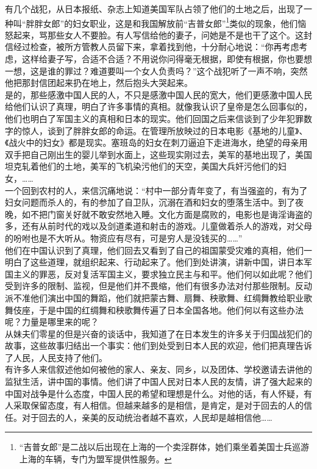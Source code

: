 有几个战犯，从日本报纸、杂志上知道美国军队占领了他们的土地之后，出现了一种叫“胖胖女郎”的妇女职业，这是和我国解放前“吉普女郎”\footnote{“吉普女郎”是二战以后出现在上海的一个卖淫群体，她们乘坐着美国士兵巡游上海的车辆，专门为盟军提供性服务。}类似的现象，他们恼怒起来，骂那些女人不要脸。有人写信给他的妻子，问她是不是也干了这个。这封信经过检查，被所方管教人员留下来，拿着找到他，十分耐心地说：“你再考虑考虑，这样给妻子写，合适不合适？不用说你问得毫无根据，即使有根据，你也要想一想，这是谁的罪过？难道要叫一个女人负责吗？”这个战犯听了一声不响，突然他把那封信团起来扔在地上，然后抱头大哭起来。\\

是的，那些感激中国人民的人，不只是感激中国人民的宽大，他们更感激中国人民给他们认识了真理，明白了许多事情的真相。就像我认识了皇帝是怎么回事似的，他们也明白了军国主义的真相和日本的现实。他们回国之后来信谈到了少年犯罪数字的惊人，谈到了胖胖女郎的命运。在管理所放映过的日本电影《基地的儿童》、《战火中的妇女》都是现实。塞班岛的妇女在刺刀逼迫下走进海水，绝望的母亲用双手把自己刚出生的婴儿举到水面上，这些现实刚过去，美军的基地出现了，美国坦克轧着他们的土地，美军的飞机染污他们的天空，美国大兵奸污他们的妇女，……\\

一个回到农村的人，来信沉痛地说：“村中一部分青年变了，有当强盗的，有为了妇女问题而杀人的，有的参加了自卫队，沉溺在酒和妇女的堕落生活中。到了夜晚，如不把门窗关好就不敢安然地入睡。文化方面是腐败的，电影也是诲淫诲盗的多，还有从前时代的戏以及剑道柔道和射击的游戏。儿童做着杀人的游戏，对父母的吩咐也是不大听从。物资应有尽有，可是穷人是没钱买的……”\\

他们在中国认识到了真理，他们回去又看到了自己的祖国蒙受灾难的真相，他们一明白了这些道理，就组织起来、行动起来了。他们到处讲演，讲新中国，讲日本军国主义的罪恶，反对复活军国主义，要求独立民主与和平。他们何以如此呢？他们受到许多的限制、监视，但是他们并不畏缩，他们有很多办法对付那些限制。反动派不准他们演出中国的舞蹈，他们就把蒙古舞、扇舞、秧歌舞、红绸舞教给职业歌舞伎座，于是中国的红绸舞和秧歌舞传遍了日本全国各地。他们何以有这些办法呢？力量是哪里来的呢？\\

从妹夫们零星的但是兴奋的谈话中，我知道了在日本发生的许多关于归国战犯们的故事，这些故事归结出一个事实：他们到处受到日本人民的欢迎，他们把真理告诉了人民，人民支持了他们。\\

有许多人来信叙述他如何被他的家人、亲友、同乡，以及团体、学校邀请去讲他的监狱生活，讲中国的事情。他们讲了中国人民对日本人民的友情，讲了强大起来的中国对战争是什么态度，中国人民的希望和理想是什么。对他的话，有人怀疑，有人采取保留态度，有人相信。但越来越多的是相信，是肯定，是对于回去的人的信任。对于回去的人，亲美的反动统治者越不喜欢，人民却是越相信他……\\

